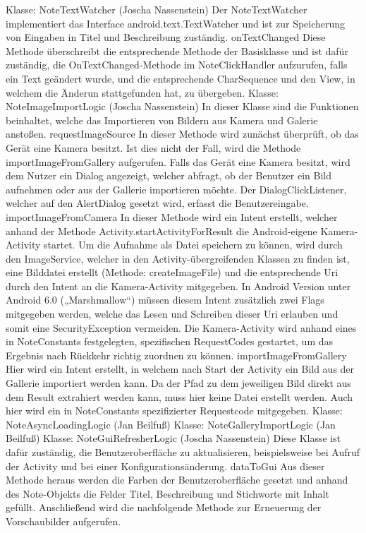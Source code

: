 Klasse: NoteTextWatcher (Joscha Nassenstein)
Der NoteTextWatcher implementiert das Interface android.text.TextWatcher und ist zur Speicherung von Eingaben in Titel und Beschreibung zuständig.
onTextChanged
Diese Methode überschreibt die entsprechende Methode der Basisklasse und ist dafür zuständig, die OnTextChanged-Methode im NoteClickHandler aufzurufen, falls ein Text geändert wurde, und die entsprechende CharSequence und den View, in welchem die Änderun stattgefunden hat, zu übergeben.
Klasse: NoteImageImportLogic (Joscha Nassenstein)
In dieser Klasse sind die Funktionen beinhaltet, welche das Importieren von Bildern aus Kamera und Galerie anstoßen.
requestImageSource
In dieser Methode wird zunächst überprüft, ob das Gerät eine Kamera besitzt. Ist dies nicht der Fall, wird die Methode importImageFromGallery aufgerufen. Falls das Gerät eine Kamera besitzt, wird dem Nutzer ein Dialog angezeigt, welcher abfragt, ob der Benutzer ein Bild aufnehmen oder aus der Gallerie importieren möchte. Der DialogClickListener, welcher auf den AlertDialog gesetzt wird, erfasst die Benutzereingabe.
importImageFromCamera
In dieser Methode wird ein Intent erstellt, welcher anhand der Methode Activity.startActivityForResult die Android-eigene Kamera-Activity startet. Um die Aufnahme als Datei speichern zu können, wird durch den ImageService, welcher in den Activity-übergreifenden Klassen zu finden ist, eine Bilddatei erstellt (Methode: createImageFile) und die entsprechende Uri durch den Intent an die Kamera-Activity mitgegeben. In Android Version unter Android 6.0 („Marshmallow“) müssen diesem Intent zusätzlich zwei Flags mitgegeben werden, welche das Lesen und Schreiben dieser Uri erlauben und somit eine SecurityException vermeiden.
Die Kamera-Activity wird anhand eines in NoteConstants festgelegten, spezifischen RequestCodes gestartet, um das Ergebnis nach Rückkehr richtig zuordnen zu können.
importImageFromGallery
Hier wird ein Intent erstellt, in welchem nach Start der Activity ein Bild aus der Gallerie importiert werden kann. Da der Pfad zu dem jeweiligen Bild direkt aus dem Result extrahiert werden kann, muss hier keine Datei erstellt werden. Auch hier wird ein in NoteConstants spezifizierter Requestcode mitgegeben. 
Klasse: NoteAsyncLoadingLogic (Jan Beilfuß)
Klasse: NoteGalleryImportLogic (Jan Beilfuß)
Klasse: NoteGuiRefresherLogic (Joscha Nassenstein)
Diese Klasse ist dafür zuständig, die Benutzeroberfläche zu aktualisieren, beispielsweise bei Aufruf der Activity und bei einer Konfigurationsänderung.
dataToGui
Aus dieser Methode heraus werden die Farben der Benutzeroberfläche gesetzt und anhand des Note-Objekts die Felder Titel, Beschreibung und Stichworte mit Inhalt gefüllt. Anschließend wird die nachfolgende Methode zur Erneuerung der Vorschaubilder aufgerufen.
